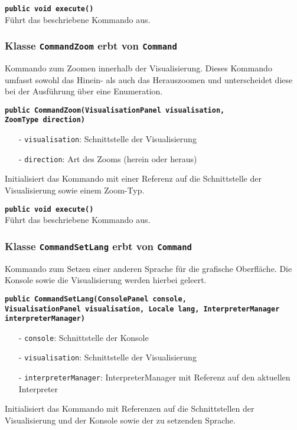 \documentclass[parskip=full,11pt,twoside]{scrartcl}
\begin{document}
\textbf{\texttt{public void execute()}}\\
Führt das beschriebene Kommando aus.

\subsubsection{Klasse \texttt{CommandZoom} erbt von \texttt{Command}}

Kommando zum Zoomen innerhalb der Visualisierung. Dieses Kommando umfasst sowohl das Hinein- als auch das Herauszoomen und unterscheidet diese bei der Ausführung über eine Enumeration.

\textbf{\texttt{public CommandZoom(VisualisationPanel visualisation,\\ZoomType direction)}}
\begin{itemize}[noitemsep]
	\item[-] \texttt{visualisation}: Schnittstelle der Visualisierung
	\item[-] \texttt{direction}: Art des Zooms (herein oder heraus)
\end{itemize}
Initialisiert das Kommando mit einer Referenz auf die Schnittstelle der Visualisierung sowie einem Zoom-Typ.

\textbf{\texttt{public void execute()}}\\
Führt das beschriebene Kommando aus.

\subsubsection{Klasse \texttt{CommandSetLang} erbt von \texttt{Command}}

Kommando zum Setzen einer anderen Sprache für die grafische Oberfläche. Die Konsole sowie die Visualisierung werden hierbei geleert.

\textbf{\texttt{public CommandSetLang(ConsolePanel console,\\VisualisationPanel visualisation, Locale lang, InterpreterManager interpreterManager)}}
\begin{itemize}[noitemsep]
	\item[-] \texttt{console}: Schnittstelle der Konsole
	\item[-] \texttt{visualisation}: Schnittstelle der Visualisierung
	\item[-] \texttt{interpreterManager}: InterpreterManager mit Referenz auf den aktuellen Interpreter
\end{itemize}
Initialisiert das Kommando mit Referenzen auf die Schnittstellen der Visualisierung und der Konsole sowie der zu setzenden Sprache.
\end{document}
